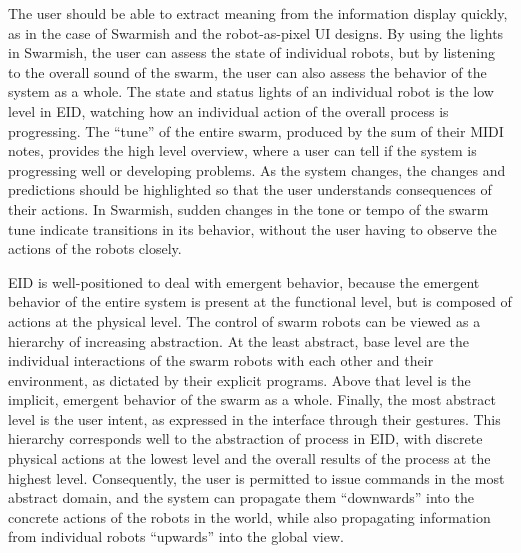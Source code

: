The user should be able to extract meaning from the information display quickly, as in the case of Swarmish and the robot-as-pixel UI designs.
By using the lights in Swarmish, the user can assess the state of individual robots, but by listening to the overall sound of the swarm, the user can also assess the behavior of the system as a whole.
The state and status lights of an individual robot is the low level in EID, watching how an individual action of the overall process is progressing. 
The ``tune'' of the entire swarm, produced by the sum of their MIDI notes, provides the high level overview, where a user can tell if the system is progressing well or developing problems. 
As the system changes, the changes and predictions should be highlighted so that the user understands consequences of their actions. 
In Swarmish, sudden changes in the tone or tempo of the swarm tune indicate transitions in its behavior, without the user having to observe the actions of the robots closely. 

EID is well-positioned to deal with emergent behavior, because the emergent behavior of the entire system is present at the functional level, but is composed of actions at the physical level.  
The control of swarm robots can be viewed as a hierarchy of increasing abstraction. 
At the least abstract, base level are the individual interactions of the swarm robots with each other and their environment, as dictated by their explicit programs. 
Above that level is the implicit, emergent behavior of the swarm as a whole. 
Finally, the most abstract level is the user intent, as expressed in the interface through their gestures. 
This hierarchy corresponds well to the abstraction of process in EID, with discrete physical actions at the lowest level and the overall results of the process at the highest level. 
Consequently, the user is permitted to issue commands in the most abstract domain, and the system can propagate them ``downwards'' into the concrete actions of the robots in the world, while also propagating information from individual robots ``upwards'' into the global view. 


